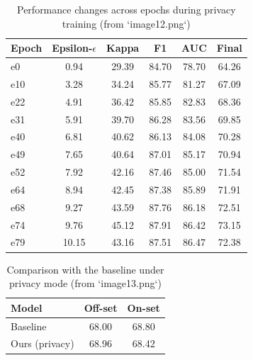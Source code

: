 \documentclass[a4paper,11pt]{article}
\begin{document}
\begin{table}[htbp]
\centering
\caption{Performance changes across epochs during privacy training (from `image12.png`)}
\begin{tabular}{lccccc}
\toprule
Epoch & Epsilon-$\epsilon$ & Kappa & F1 & AUC & Final \\
\midrule
e0 & 0.94 & 29.39 & 84.70 & 78.70 & 64.26 \\
e10 & 3.28 & 34.24 & 85.77 & 81.27 & 67.09 \\
e22 & 4.91 & 36.42 & 85.85 & 82.83 & 68.36 \\
e31 & 5.91 & 39.70 & 86.28 & 83.56 & 69.85 \\
e40 & 6.81 & 40.62 & 86.13 & 84.08 & 70.28 \\
e49 & 7.65 & 40.64 & 87.01 & 85.17 & 70.94 \\
e52 & 7.92 & 42.16 & 87.46 & 85.00 & 71.54 \\
e64 & 8.94 & 42.45 & 87.38 & 85.89 & 71.91 \\
e68 & 9.27 & 43.59 & 87.76 & 86.18 & 72.51 \\
e74 & 9.76 & 45.12 & 87.91 & 86.42 & 73.15 \\
e79 & 10.15 & 43.16 & 87.51 & 86.47 & 72.38 \\
\bottomrule
\end{tabular}
\end{table}

\begin{table}[htbp]
\centering
\caption{Comparison with the baseline under privacy mode (from `image13.png`)}
\begin{tabular}{lcc}
\toprule
Model & Off-set & On-set \\
\midrule
Baseline & 68.00 & 68.80 \\
Ours (privacy) & 68.96 & 68.42 \\
\bottomrule
\end{tabular}
\end{table}
\end{document}
